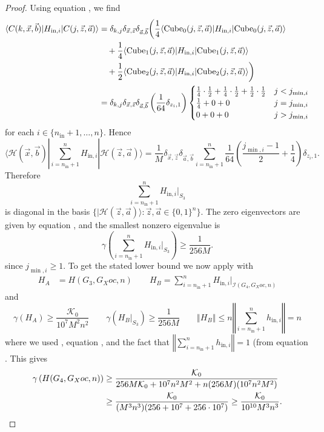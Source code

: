 \documentclass[../thesis-main/thesis-main]{subfiles}
\begin{document}
\begin{proof}
Using equation , we find
\begin{align*}
\langle C(k,\vec{x},\vec{b})|H_{\text{in},i}|C(j,\vec{z},\vec{a})\rangle
&=\delta_{k,j} \delta_{\vec{x},\vec{z}}\delta_{\vec{a},\vec{b}}\bigg(\frac{1}{4}\langle {\operatorname{Cube}_0(j,\vec{z},\vec{a})}|H_{\text{in},i}|{\operatorname{Cube}_0(j,\vec{z},\vec{a})}\rangle\\
&\quad+\frac{1}{4}\langle {\operatorname{Cube}_1(j,\vec{z},\vec{a})}|H_{\text{in},i}| {\operatorname{Cube}_1(j,\vec{z},\vec{a})}\rangle \\
&\quad+\frac{1}{2}\langle {\operatorname{Cube}_2(j,\vec{z},\vec{a})}|H_{\text{in},i}| {\operatorname{Cube}_2(j,\vec{z},\vec{a})}\rangle\bigg)\\
&=\delta_{k,j} \delta_{\vec{x},\vec{z}}\delta_{\vec{a},\vec{b}}\left(\frac{1}{64}\delta_{z_i,1}\right)\begin{cases}
\frac{1}{4}\cdot\frac{1}{2}+\frac{1}{4}\cdot\frac{1}{2}+\frac{1}{2}\cdot\frac{1}{2} & j<j_{\min,i}\\
\frac{1}{4}+0+0 & j=j_{\min,i}\\
0+0+0 & j>j_{\min,i}
\end{cases}
\end{align*}
for each $i\in\{n_{\text{in}}+1,\ldots,n\}$. Hence 
\[
\langle\mathcal{H}(\vec{x},\vec{b})|\sum_{i=n_{\text{in}}+1}^{n}H_{\text{in},i}|\mathcal{H}(\vec{z},\vec{a})\rangle=\frac{1}{M}\delta_{\vec{x},\vec{z}}\delta_{\vec{a},\vec{b}}\sum_{i=n_{\text{in}}+1}^{n}\frac{1}{64}\left(\frac{j_{\min,i}-1}{2}+\frac{1}{4}\right)\delta_{z_{i},1}.
\]
Therefore
\[
\sum_{i=n_{\text{in}}+1}^{n}H_{\text{in},i}\big|_{S_{3}}
\]
is diagonal in the basis $\{|\mathcal{H}(\vec{z},\vec{a})\rangle\colon\vec{z},\vec{a}\in\{0,1\}^{n}\}$. The zero eigenvectors are given by equation , and the smallest nonzero eigenvalue is
\begin{equation}
\gamma\left(\sum_{i=n_{\text{in}}+1}^{n}H_{\text{in},i}\big|_{S_{3}}\right)\geq\frac{1}{256M}.\label{eq:lbnd_Hinj}
\end{equation}
since $j_{\min,i}\geq1$. To get the stated lower bound we now apply  with 
\begin{align*}
H_{A} & =H(G_{3},G_Xoc,n)\qquad H_{B}=\sum_{i=n_{\text{in}}+1}^{n}H_{\text{in},i}\big|_{\mathcal{I}(G_{4},G_Xoc,n)}
\end{align*}
and
\[
  \gamma(H_{A}) \geq \frac{\mathcal{K}_0}{10^7 M^{2}n^{2}} \qquad
  \gamma(H_{B}|_{S_{3}})\geq\frac{1}{256M} \qquad 
  \left\Vert H_{B}\right\Vert 
    \leq n\left\Vert \sum_{i=n_{\text{in}}+1}^{n}h_{\text{in},i}\right\Vert = n
\]
where we used , equation , and the fact that $\left\Vert \sum_{i=n_{\text{in}}+1}^{n}h_{\text{in},i}\right\Vert =1$ (from equation . This gives
\begin{align*}
\gamma \left(H(G_4,G_Xoc,n)\right)
&\geq \frac{\mathcal{K}_0}{256M\mathcal{K}_0+10^7n^2M^2+n(256M)(10^7n^2M^2)} \\
&\geq \frac{\mathcal{K}_0}{(M^3n^3)(256+10^7+256\cdot 10^7)}
 \geq \frac{\mathcal{K}_0}{10^{10} M^3n^3}. \qedhere
\end{align*}
\end{proof}
\end{document}
